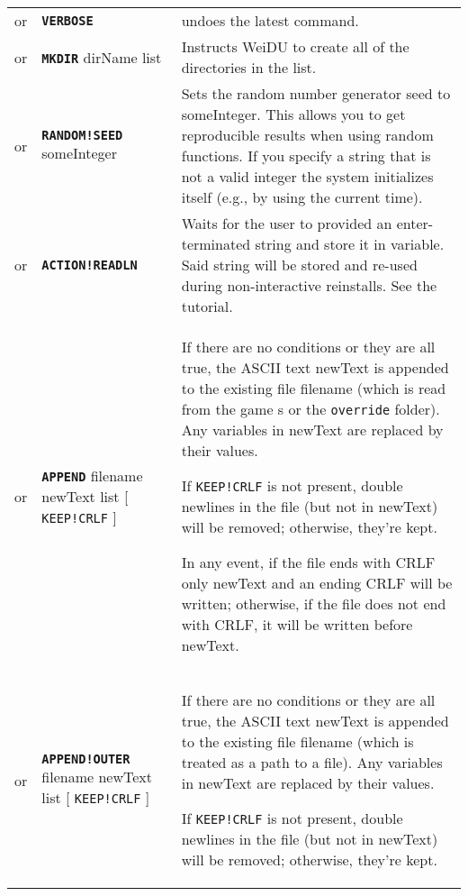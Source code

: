 \documentclass{article}
\def\ttref#1{\ahrefloc{#1}{\tt #1}}
\def\DEFINE#1{{\tt \bf #1}\label{#1}\index{#1}}
\def\DEFSYN#1{{\tt \bf #1}\index{#1}}
\def\t#1{{\tt #1}}
\def\Slist{{\color{red} list }}
\def\Ob{{\color{red} [ }}
\def\Oe{{\color{red} ] }}
\begin{document}
\begin{tabular}{cp{10in}|p{10in}}
  or & \DEFINE{VERBOSE} & undoes the latest \ttref{SILENT} command. \\
  or & \DEFINE{MKDIR} dirName \Slist &
      Instructs WeiDU to create all of the directories in the list. \\
  or & \DEFINE{RANDOM!SEED} someInteger &
      Sets the random number generator seed to someInteger. This allows you
      to get reproducible results when using random functions. If you
      specify a string that is not a valid integer the system initializes
      itself (e.g., by using the current time).  \\
  or & \DEFINE{ACTION!READLN} \ttref{variable} &
      Waits for the user to provided an enter-terminated string and store it in
      variable. Said string will be stored and re-used during non-interactive reinstalls. See the
      \ttref{READLN} tutorial. \\
or & \DEFSYN{APPEND} \ttref{optNoBackup} filename newText \ttref{when} \Slist \Ob \t{KEEP!CRLF} \Oe  &
      If there are no \ttref{when} conditions or they are all true, the
      ASCII text newText is appended to the existing file filename (which
      is read from the game \ttref{BIFF}s or the \t{override} folder).
      Any variables in newText are replaced by their values.

      If \t{KEEP!CRLF} is not present, double newlines in the file
      (but not in newText) will be removed; otherwise, they're kept.

      In any event, if the file ends with CRLF only newText and an ending
      CRLF will be written; otherwise, if the file does not end with CRLF,
      it will be written before newText.
      \\
  or & \DEFINE{APPEND!OUTER} \ttref{optNoBackup} filename newText \ttref{when} \Slist \Ob \t{KEEP!CRLF} \Oe  &
      If there are no \ttref{when} conditions or they are all true, the
      ASCII text newText is appended to the existing file filename (which
      is treated as a path to a file).
      Any variables in newText are replaced by their values.

      If \t{KEEP!CRLF} is not present, double newlines in the file
      (but not in newText) will be removed; otherwise, they're kept.


\end{tabular}
\end{document}
